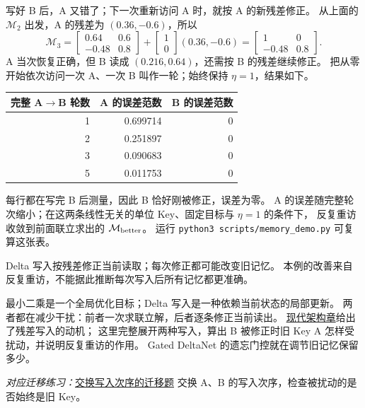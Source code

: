 写好 B 后，A 又错了；下一次重新访问 A 时，就按 A 的新残差修正。
从上面的 $\mathcal{M}_2$ 出发，A 的残差为 $(0.36,-0.6)$，所以
\[
\mathcal{M}_3
=\begin{bmatrix}0.64&0.6\\-0.48&0.8\end{bmatrix}
+\begin{bmatrix}1\\0\end{bmatrix}(0.36,-0.6)
=\begin{bmatrix}1&0\\-0.48&0.8\end{bmatrix}.
\]
A 当次恢复正确，但 B 读成 $(0.216,0.64)$，还需按 B 的残差继续修正。
把从零开始依次访问一次 A、一次 B 叫作一轮；始终保持 $\eta=1$，结果如下。
\begin{center}\small
{}
\begin{tabular}{@{}rrr@{}}\toprule
完整 A$\to$B 轮数 & A 的误差范数 & B 的误差范数\\\midrule
1 & 0.699714 & 0\\
2 & 0.251897 & 0\\
3 & 0.090683 & 0\\
5 & 0.011753 & 0\\\bottomrule
\end{tabular}
\end{center}
每行都在写完 B 后测量，因此 B 恰好刚被修正，误差为零。
A 的误差随完整轮次缩小；在这两条线性无关的单位 Key、固定目标与 $\eta=1$ 的条件下，
反复重访收敛到前面联立求出的 $\mathcal{M}_{\rm better}$。
运行 \texttt{python3 scripts/memory\_demo.py} 可复算这张表。

\begin{boundarybox}
Delta 写入按残差修正当前读取；每次修正都可能改变旧记忆。
本例的改善来自反复重访，不能据此推断每次写入后所有记忆都更准确。
\end{boundarybox}

\begin{idea}
最小二乘是一个全局优化目标；Delta 写入是一种依赖当前状态的局部更新。
两者都在减少干扰：前者一次求联立解，后者逐条修正当前读出。
\hyperref[sec:modern-delta-rule]{现代架构章}给出了残差写入的动机；
这里完整展开两种写入，算出 B 被修正时旧 Key A 怎样受扰动，并说明反复重访的作用。
Gated DeltaNet 的遗忘门控就在调节旧记忆保留多少。
\end{idea}

\noindent\emph{对应迁移练习：}\hyperref[exercise:delta-reverse]{交换写入次序的迁移题}
交换 A、B 的写入次序，检查被扰动的是否始终是旧 Key。

